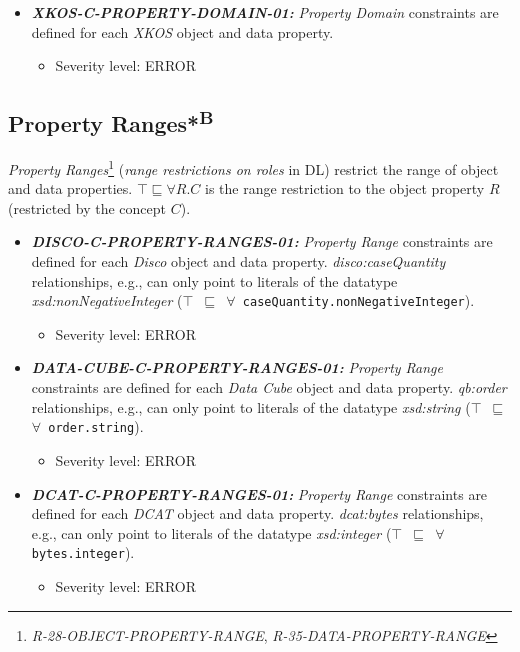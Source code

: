 \documentclass{llncs}
\newcommand{\ms}[1]{\texttt{#1}}
\begin{document}
\begin{itemize}
	\item \textbf{{\em XKOS-C-PROPERTY-DOMAIN-01:}} 
	{\em Property Domain} constraints are defined for each \emph{XKOS} object and data property.
	\begin{itemize}
		\item Severity level: ERROR
	\end{itemize}
\end{itemize}

\subsection{Property Ranges*\textsuperscript{B}}

{\em Property Ranges}\footnote{{\em R-28-OBJECT-PROPERTY-RANGE}, {\em R-35-DATA-PROPERTY-RANGE}} ({\em range restrictions on roles} in DL) restrict the range of object and data properties.
$\top \sqsubseteq \forall R . C$ is the range restriction to the object property $R$ (restricted by the concept $C$). 

\begin{itemize}
	\item \textbf{{\em DISCO-C-PROPERTY-RANGES-01:}} 
	{\em Property Range} constraints are defined for each \emph{Disco} object and data property.
  {\em disco:caseQuantity} relationships, e.g., can only point to literals of the datatype {\em xsd:nonNegativeInteger} (\ms{$\top$ $\sqsubseteq$ $\forall$ caseQuantity.nonNegativeInteger}).
	\begin{itemize}
		\item Severity level: ERROR
	\end{itemize}
\end{itemize}

\begin{itemize}
	\item \textbf{{\em DATA-CUBE-C-PROPERTY-RANGES-01:}} 
	{\em Property Range} constraints are defined for each \emph{Data Cube} object and data property.
  {\em qb:order} relationships, e.g., can only point to literals of the datatype {\em xsd:string} (\ms{$\top$ $\sqsubseteq$ $\forall$ order.string}).
	\begin{itemize}
		\item Severity level: ERROR
	\end{itemize}
\end{itemize}

\begin{itemize}
	\item \textbf{{\em DCAT-C-PROPERTY-RANGES-01:}} 
	{\em Property Range} constraints are defined for each \emph{DCAT} object and data property.
  {\em dcat:bytes} relationships, e.g., can only point to literals of the datatype {\em xsd:integer} (\ms{$\top$ $\sqsubseteq$ $\forall$ bytes.integer}).
	\begin{itemize}
		\item Severity level: ERROR
	\end{itemize}
\end{itemize}
\end{document}
